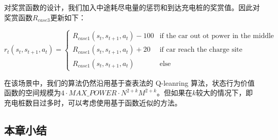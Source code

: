 \documentclass{standalone}
\begin{document}
对奖赏函数的设计，我们加入中途耗尽电量的惩罚和到达充电桩的奖赏值。因此对奖赏函数$R_{case3}$更新如下：
\begin{center}
    \begin{equation}
    r_t(s_t, s_{t+1}, a_t) = \begin{cases}
     R_{case1}(s_t, s_{t+1}, a_t) - 100 &\mbox{if the car out ot power in the middle}\\
     R_{case1}(s_t, s_{t+1}, a_t) + 20&\mbox{if car reach the charge site}\\
     R_{case1}(s_t, s_{t+1}, a_t)&\mbox{else}
     \end{cases}
    \end{equation}
\end{center}
在该场景中，我们的算法仍然沿用基于查表法的 Q-leanring 算法，状态行为价值函数的空间规模为$4\cdot MAX\_POWER\cdot N^{2+k}M^{2+k}$。但如果在$k$较大的情况下，即充电桩数目过多时，可以考虑使用基于函数近似的方法。
\subsection{本章小结}
\end{document}
